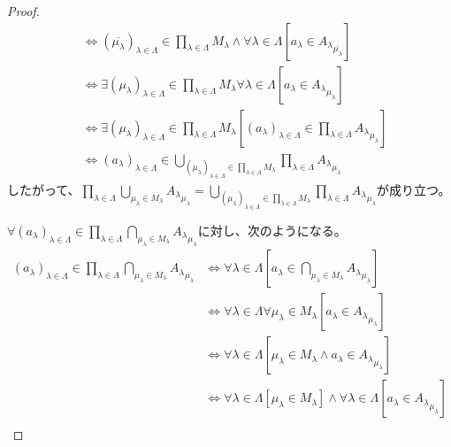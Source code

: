 \documentclass[a4paper]{jsarticle}
\begin{document}
\begin{proof}
\begin{align*}
&\Leftrightarrow \left( \overline{\mu_{\lambda}} \right)_{\lambda \in \varLambda} \in \prod_{\lambda \in \varLambda} M_{\lambda} \land \forall\lambda \in \varLambda\left[ a_{\lambda} \in {A_{\lambda}}_{\overline{\mu_{\lambda}}} \right]\\
&\Leftrightarrow \exists\left( \mu_{\lambda} \right)_{\lambda \in \varLambda} \in \prod_{\lambda \in \varLambda} M_{\lambda}\forall\lambda \in \varLambda\left[ a_{\lambda} \in {A_{\lambda}}_{\mu_{\lambda}} \right]\\
&\Leftrightarrow \exists\left( \mu_{\lambda} \right)_{\lambda \in \varLambda} \in \prod_{\lambda \in \varLambda} M_{\lambda}\left[ \left( a_{\lambda} \right)_{\lambda \in \varLambda} \in \prod_{\lambda \in \varLambda} {A_{\lambda}}_{\mu_{\lambda}} \right]\\
&\Leftrightarrow \left( a_{\lambda} \right)_{\lambda \in \varLambda} \in \bigcup_{\left( \mu_{\lambda} \right)_{\lambda \in \varLambda} \in \prod_{\lambda \in \varLambda} M_{\lambda}} {\prod_{\lambda \in \varLambda} {A_{\lambda}}_{\mu_{\lambda}}}
\end{align*}
したがって、$\prod_{\lambda \in \varLambda} {\bigcup_{\mu_{\lambda} \in M_{\lambda}} {A_{\lambda}}_{\mu_{\lambda}}} = \bigcup_{\left( \mu_{\lambda} \right)_{\lambda \in \varLambda} \in \prod_{\lambda \in \varLambda} M_{\lambda}} {\prod_{\lambda \in \varLambda} {A_{\lambda}}_{\mu_{\lambda}}}$が成り立つ。\par
$\forall\left( a_{\lambda} \right)_{\lambda \in \varLambda} \in \prod_{\lambda \in \varLambda} {\bigcap_{\mu_{\lambda} \in M_{\lambda}} {A_{\lambda}}_{\mu_{\lambda}}}$に対し、次のようになる。
\begin{align*}
\left( a_{\lambda} \right)_{\lambda \in \varLambda} \in \prod_{\lambda \in \varLambda} {\bigcap_{\mu_{\lambda} \in M_{\lambda}} {A_{\lambda}}_{\mu_{\lambda}}} &\Leftrightarrow \forall\lambda \in \varLambda\left[ a_{\lambda} \in \bigcap_{\mu_{\lambda} \in M_{\lambda}} {A_{\lambda}}_{\mu_{\lambda}} \right]\\
&\Leftrightarrow \forall\lambda \in \varLambda\forall\mu_{\lambda} \in M_{\lambda}\left[ a_{\lambda} \in {A_{\lambda}}_{\mu_{\lambda}} \right]\\
&\Leftrightarrow \forall\lambda \in \varLambda\left[ \mu_{\lambda} \in M_{\lambda} \land a_{\lambda} \in {A_{\lambda}}_{\mu_{\lambda}} \right]\\
&\Leftrightarrow \forall\lambda \in \varLambda\left[ \mu_{\lambda} \in M_{\lambda} \right] \land \forall\lambda \in \varLambda\left[ a_{\lambda} \in {A_{\lambda}}_{\mu_{\lambda}} \right]\\

\end{align*}
\end{proof}
\end{document}
